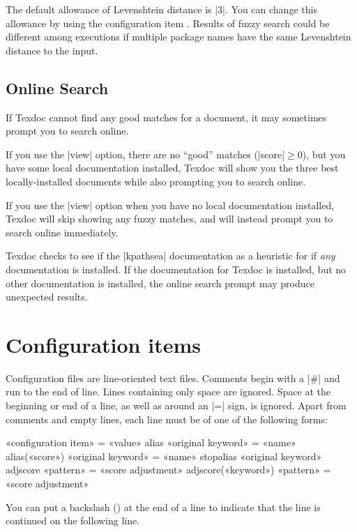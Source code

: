\documentclass{texdoc-doc}
\begin{document}
The default allowance of Levenshtein distance is |3|. You can change this
allowance by using the configuration item . Results of fuzzy
search could be different among executions if multiple package names have the
same Levenshtein distance to the input.

\subsection{Online Search}
\label{sec:online}

If Texdoc cannot find any good matches for a document, it may sometimes prompt
you to search online.

If you use the |view| option, there are no ``good'' matches (|score|${}\ge{}$0),
but you have some local documentation installed, Texdoc will show you the three
best locally-installed documents while also prompting you to search online.

If you use the |view| option when you have no local documentation installed,
Texdoc will skip showing any fuzzy matches, and will instead prompt you to
search online immediately.

Texdoc checks to see if the |kpathsea| documentation as a heuristic for if
\emph{any} documentation is installed. If the documentation for Texdoc is
installed, but no other documentation is installed, the online search prompt
may produce unexpected results.

\section{Configuration items}
\label{sec:conf}

Configuration files are line-oriented text files. Comments begin with a |#|
and run to the end of line. Lines containing only space are ignored. Space at
the beginning or end of a line, as well as around an |=| sign, is ignored.
Apart from comments and empty lines, each line must be of one of the following
forms:
%
\begin{htcode}
«configuration item» = «value»
alias «original keyword» = «name»
alias(«score») «original keyword» = «name»
stopalias «original keyword»
adjscore «pattern» = «score adjustment»
adjscore(«keyword») «pattern» = «score adjustment»
\end{htcode}
%
You can put a backslash () at the end of a line to indicate that
the line is continued on the following line.
\end{document}
